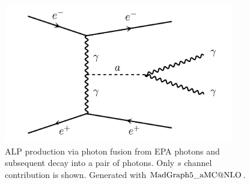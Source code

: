 \documentclass[aps,onecolumn,twoside,secnumarabic,12pt,balancelastpage,amsmath,amssymb,nofootinbib,hyperref=pdftex]{revtex4}
\begin{document}
\begin{figure}[t]
\begin{center}
\includegraphics[width=10cm]{ALP_fusion_diagram.png}
\caption{ALP production via photon fusion from EPA photons and subsequent decay into a pair of photons. Only $s$ channel contribution is shown. Generated with $\rm{MadGraph5\_aMC@NLO}$.}
\label{fig:ALPfusion_diagram}
\end{center}
\end{figure}
\end{document}
